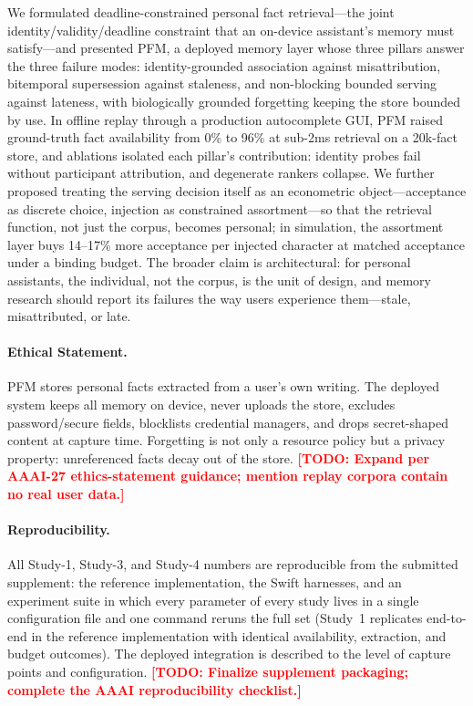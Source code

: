 \documentclass[letterpaper]{article}
\newcommand{\todo}[1]{\textbf{\textcolor{red}{[TODO: #1]}}}
\begin{document}
We formulated deadline-constrained personal fact retrieval---the joint
identity/validity/deadline constraint that an on-device assistant's
memory must satisfy---and presented PFM, a deployed memory layer whose
three pillars answer the three failure modes: identity-grounded
association against misattribution, bitemporal supersession against
staleness, and non-blocking bounded serving against lateness, with
biologically grounded forgetting keeping the store bounded by use. In
offline replay through a production autocomplete GUI, PFM raised
ground-truth fact availability from 0\% to 96\% at sub-2ms retrieval on
a 20k-fact store, and ablations isolated each pillar's contribution:
identity probes fail without participant attribution, and degenerate
rankers collapse. We further proposed treating the serving decision
itself as an econometric object---acceptance as discrete choice,
injection as constrained assortment---so that the retrieval function,
not just the corpus, becomes personal; in simulation, the assortment
layer buys 14--17\% more acceptance per injected character at matched
acceptance under a binding budget. The broader claim is
architectural: for personal assistants, the individual, not the corpus,
is the unit of design, and memory research should report its failures
the way users experience them---stale, misattributed, or late.


\paragraph{Ethical Statement.}
PFM stores personal facts extracted from a user's own writing. The
deployed system keeps all memory on device, never uploads the store,
excludes password/secure fields, blocklists credential managers, and
drops secret-shaped content at capture time. Forgetting is not only a
resource policy but a privacy property: unreferenced facts decay out of
the store. \todo{Expand per AAAI-27 ethics-statement guidance; mention
replay corpora contain no real user data.}

\paragraph{Reproducibility.}
All Study-1, Study-3, and Study-4 numbers are reproducible from the
submitted supplement: the reference implementation, the Swift harnesses,
and an experiment suite in which every parameter of every study lives in
a single configuration file and one command reruns the full set
(Study~1 replicates end-to-end in the reference implementation with
identical availability, extraction, and budget outcomes). The deployed
integration is described to the level of capture points and
configuration. \todo{Finalize supplement packaging; complete the AAAI
reproducibility checklist.}

\end{document}
